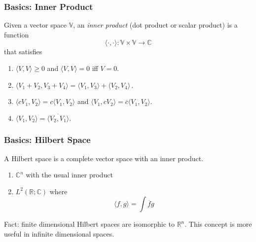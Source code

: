 \documentclass[12pt, aspectratio=169]{beamer}
\begin{document}
\begin{frame}
    \frametitle{ Basics: Inner Product}
    \begin{definition}
        Given a vector space $\mathbb{V}$, an \emph{inner product } (dot product or scalar product)
        is a function
        \begin{equation*}
            \langle \cdot, \cdot \rangle : \mathbb{V}\times \mathbb{V} \to \mathbb{C}
        \end{equation*}
        that satisfies
        \begin{enumerate}
            \item $\langle V, V\rangle \geq 0$ and $\langle V, V \rangle = 0$ iff $V = 0$.
            \item $\langle V_1 + V_2, V_3 + V_4 \rangle = \langle V_1 , V_3 \rangle +
                                                \langle V_2 , V_4 \rangle \,.$
            \item $\langle c V_1, V_2\rangle = c \langle V_1, V_2 \rangle $
                and
                $ \langle V_1, c V_2 \rangle = \overline{c} \langle V_1, V_2 \rangle$.
            \item $\langle V_1, V_2 \rangle = \overline{ \langle V_2, V_1 \rangle  }$.
        \end{enumerate}
    \end{definition}
\end{frame}


\begin{frame}
    \frametitle{ Basics: Hilbert Space}
    \begin{definition}
        A Hilbert space is a complete vector space with an inner product.
    \end{definition}
    \begin{example}
        \begin{enumerate}
            \item $\mathbb{C}^n$ with the usual inner product
            \item $L^2(\mathbb{R};\mathbb{C})$ where
                \begin{equation*}
                    \langle f, g \rangle = \int \overline{f} g 
                \end{equation*}
        \end{enumerate}
        Fact: finite dimensional Hilbert spaces are isomorphic to $\mathbb{R}^n$.
        This concept is more useful in infinite dimensional spaces.
    \end{example}

\end{frame}
\end{document}
